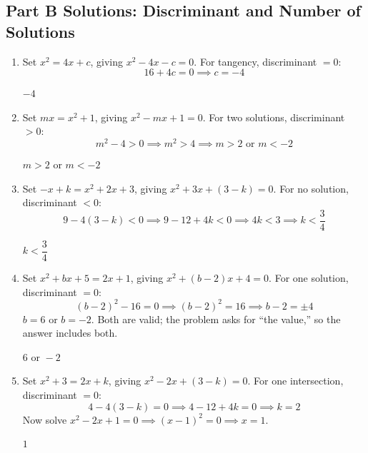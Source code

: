 \documentclass[14pt]{extarticle}
\begin{document}
\subsection*{Part B Solutions: Discriminant and Number of Solutions}
\begin{enumerate}
  \item Set \(x^2 = 4x + c\), giving \(x^2 - 4x - c = 0\). For tangency, discriminant \(= 0\):
  \[
  16 + 4c = 0 \implies c = -4
  \]

  \(\boxed{-4}\)

  \item Set \(mx = x^2 + 1\), giving \(x^2 - mx + 1 = 0\). For two solutions, discriminant \(> 0\):
  \[
  m^2 - 4 > 0 \implies m^2 > 4 \implies m > 2 \text{ or } m < -2
  \]

  \(\boxed{m > 2 \text{ or } m < -2}\)

  \item Set \(-x + k = x^2 + 2x + 3\), giving \(x^2 + 3x + (3 - k) = 0\). For no solution, discriminant \(< 0\):
  \[
  9 - 4(3 - k) < 0 \implies 9 - 12 + 4k < 0 \implies 4k < 3 \implies k < \frac{3}{4}
  \]

  \(\boxed{k < \dfrac{3}{4}}\)

  \item Set \(x^2 + bx + 5 = 2x + 1\), giving \(x^2 + (b - 2)x + 4 = 0\). For one solution, discriminant \(= 0\):
  \[
  (b - 2)^2 - 16 = 0 \implies (b - 2)^2 = 16 \implies b - 2 = \pm 4
  \]
  \(b = 6\) or \(b = -2\). Both are valid; the problem asks for ``the value,'' so the answer includes both.

  \(\boxed{6 \text{ or } -2}\)

  \item Set \(x^2 + 3 = 2x + k\), giving \(x^2 - 2x + (3 - k) = 0\). For one intersection, discriminant \(= 0\):
  \[
  4 - 4(3 - k) = 0 \implies 4 - 12 + 4k = 0 \implies k = 2
  \]
  Now solve \(x^2 - 2x + 1 = 0 \implies (x - 1)^2 = 0 \implies x = 1\).

  \(\boxed{1}\)
\end{enumerate}
\end{document}
